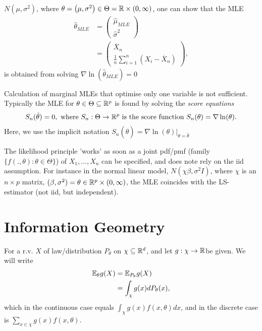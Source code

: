 \documentclass[a4paper]{article}
\begin{document}
\begin{eg}
	$N\left( \mu, \sigma^2 \right) $, where $\theta = \left( \mu, \sigma^2 \right) \in \Theta = \mathbb{R} \times (0, \infty)$, one can show that the MLE
	\begin{align*}
		\hat{\theta}_{MLE} &= \begin{pmatrix} \hat{\mu}_{MLE} \\ \hat{\sigma}^2\end{pmatrix} \\
		&= \begin{pmatrix} \overline{X}_{n} \\ \frac{1}{n} \sum_{i=1}^{n}\left( X_{i} - \overline{X}_{n} \right)  \end{pmatrix} 
	,\end{align*}
	is obtained from solving  $\nabla \ln(\hat{\theta}_{MLE}) = 0$
\end{eg}

\begin{remark}
	Calculation of marginal MLEs that optimise only one variable is not sufficient. Typically the MLE for $\theta \in \Theta \subseteq \mathbb{R}^{p}$ is found by solving the \textit{score equations}
	\[
		S_{n}( \hat{\theta}) = 0, \text{ where } S_{n} : \Theta \to  \mathbb{R}^{p} \text{ is the score function } S_{n} (\theta) = \nabla \ln(\theta)
	.\]
	Here, we use the implicit notation $S_{n}(\hat{\theta}) = \nabla \ln(\theta) |_{\theta = \hat{\theta}}$
\end{remark}

\begin{remark}
	The likelihood principle 'works' as soon as a joint pdf/pmf (family $\{f\left( ., \theta \right) : \theta \in  \Theta\} $) of $X_{1}, \ldots, X_{n}$ can be specified, and does note rely on the iid assumption. For instance in the normal linear model, $N\left( \chi \beta, \sigma^2 I \right) $, where $\chi$ is an $n\times p$ matrix, $(\beta, \sigma^2) = \theta \in \mathbb{R}^{p} \times (0, \infty)$, the MLE coincides with the LS-estimator (not iid, but independent).
\end{remark}

\section{Information Geometry}

For a r.v. $X$ of law/distribution $P_{\theta}$ on $\chi \subseteq \mathbb{R}^{d}$, and let $g: \chi \to  \mathbb{R}$be given. We will write
\begin{align*}
	\mathbb{E}_{\theta} g(X) &= \mathbb{E}_{P_{\theta}} g(X) \\
	&= \int_{\chi} g(x) dP_{\theta}(x)
,\end{align*}
which in the continuous case equals $\int_{\chi} g(x) f(x, \theta) dx$, and in the discrete case is $\sum_{x \in \chi}g(x) f(x, \theta)$.
\end{document}
